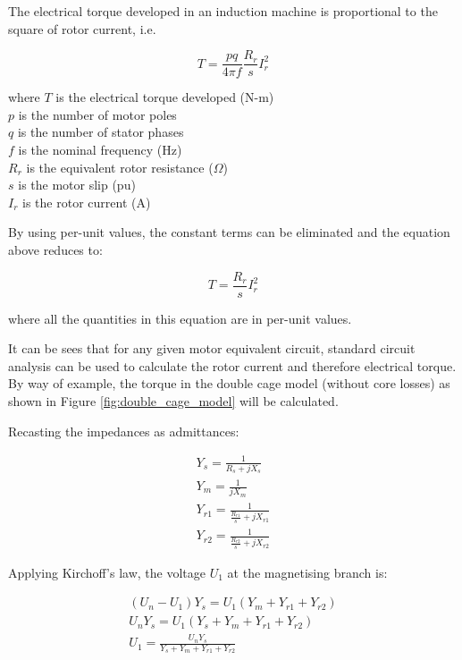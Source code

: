 \documentclass{article}
\begin{document}
The electrical torque developed in an induction machine is proportional to the square of rotor current, i.e. 

\begin{equation}
T = \frac{pq}{4 \pi f} \frac{R_{r}}{s} I_{r}^{2}
\end{equation}

\noindent where $T$ is the electrical torque developed (N-m) \\ 
\indent $p$ is the number of motor poles \\
\indent $q$ is the number of stator phases \\
\indent $f$ is the nominal frequency (Hz) \\
\indent $R_{r}$ is the equivalent rotor resistance ($\Omega$) \\
\indent $s$ is the motor slip (pu) \\
\indent $I_{r}$ is the rotor current (A)

By using per-unit values, the constant terms can be eliminated and the equation above reduces to:

\begin{equation}
T = \frac{R_{r}}{s} I_{r}^{2}
\end{equation}

where all the quantities in this equation are in per-unit values. 

It can be sees that for any given motor equivalent circuit, standard circuit analysis can be used to calculate the rotor current and therefore electrical torque. By way of example, the torque in the double cage model (without core losses) as shown in Figure \ref{fig:double_cage_model} will be calculated. 

Recasting the impedances as admittances:

\begin{eqnarray}
Y_{s} = \frac{1}{R_{s} + j X_{s}} \\
Y_{m} = \frac{1}{j X_{m}} \\
Y_{r1} = \frac{1}{\frac{R_{r1}}{s} + j X_{r1}} \\
Y_{r2} = \frac{1}{\frac{R_{r2}}{s} + j X_{r2}}
\end{eqnarray}

Applying Kirchoff's law, the voltage $U_{1}$ at the magnetising branch is:

\begin{eqnarray}
\left( U_{n} - U_{1} \right) Y_{s} = U_{1} \left( Y_{m} + Y_{r1} + Y_{r2} \right) \\
U_{n} Y_{s} = U_{1} \left( Y_{s} + Y_{m} + Y_{r1} + Y_{r2} \right) \\
U_{1} = \frac{U_{n} Y_{s}}{Y_{s} + Y_{m} + Y_{r1} + Y_{r2}}
\end{eqnarray}
\end{document}
